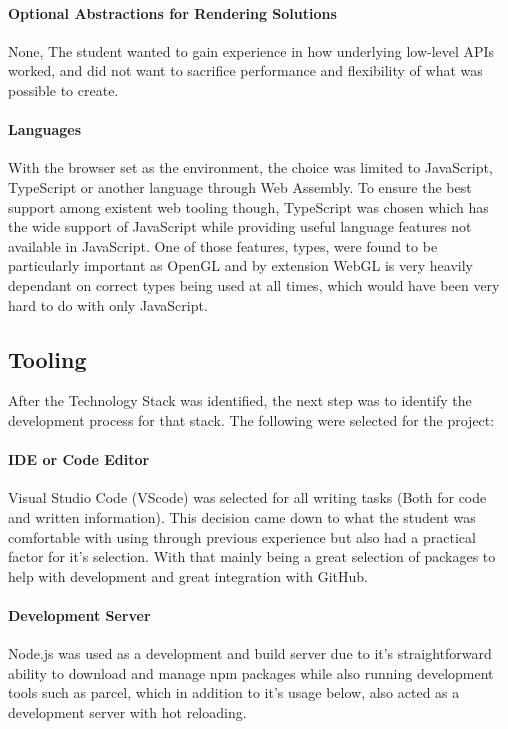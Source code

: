 \paragraph{Optional Abstractions for Rendering Solutions}
None, The student wanted to gain experience in how underlying low-level APIs worked, and did not want to sacrifice performance and flexibility of what was possible to create.

\paragraph{Languages}
With the browser set as the environment, the choice was limited to JavaScript, TypeScript or another language through Web Assembly. To ensure the best support among existent web tooling though, TypeScript was chosen which has the wide support of JavaScript while providing useful language features not available in JavaScript. One of those features, types, were found to be particularly important as OpenGL and by extension WebGL is very heavily dependant on correct types being used at all times, which would have been very hard to do with only JavaScript.

\subsection{Tooling}
After the Technology Stack was identified, the next step was to identify the development process for that stack. The following were selected for the project:

\paragraph{IDE or Code Editor}
Visual Studio Code (VScode) was selected for all writing tasks (Both for code and written information). This decision came down to what the student was comfortable with using through previous experience but also had a practical factor for it's selection. With that mainly being a great selection of packages to help with development and great integration with GitHub.

\paragraph{Development Server}
Node.js was used as a development and build server due to it's straightforward ability to download and manage npm packages while also running development tools such as parcel, which in addition to it's usage below, also acted as a development server with hot reloading.

